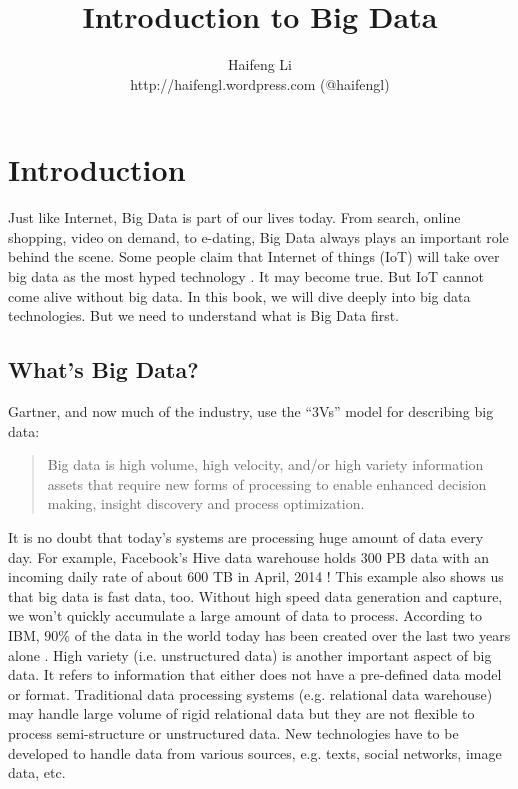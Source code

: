 \documentclass[12pt]{book}
\begin{document}


\title{Introduction to Big Data}

\author{Haifeng Li\\http://haifengl.wordpress.com (@haifengl)}



\frontmatter                            %
\maketitle                              %
\tableofcontents                        %
\mainmatter   


\chapter[Introduction]
{Introduction}
Just like Internet, Big Data is part of our lives today. From search, online shopping, video on demand, to e-dating, Big Data always plays an important role behind the scene.
Some people claim that Internet of things (IoT) will take over big data as the most hyped technology \cite{Gartner2014}. It may become true. But IoT cannot come alive without big data.
In this book, we will dive deeply into big data technologies. But we need to understand what is Big Data first.

\section{What's Big Data?}
Gartner, and now much of the industry, use the ``3Vs'' model \cite{Laney2012} for describing big data:
\begin{quote}
Big data is high volume, high velocity, and/or high variety information assets that require new forms of processing to enable enhanced decision making, insight discovery and process optimization.
\end{quote}
It is no doubt that today's systems are processing huge amount of data every day. For example, Facebook's Hive data warehouse holds 300 PB data with an incoming daily rate of about 600 TB in April, 2014 \cite{VagateWilfong2014}! This example also shows us that big data is fast data, too. Without high speed data generation and capture, we won't quickly accumulate a large amount of data to process. According to IBM, $90\%$ of the data in the world today has been created over the last two years alone \cite{IBM2013}. High variety (i.e. unstructured data) is another important aspect of big data. It refers to information that either does not have a pre-defined data model or format. Traditional data processing systems (e.g. relational data warehouse) may handle large volume of rigid relational data but they are not flexible to process semi-structure or unstructured data. New technologies have to be developed to handle data from various sources, e.g. texts, social networks, image data, etc.
\end{document}
